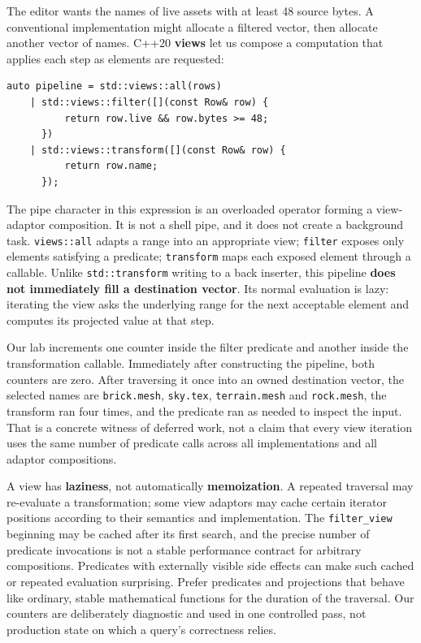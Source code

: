 The editor wants the names of live assets with at least 48 source bytes. A conventional implementation might allocate a filtered vector, then allocate another vector of names. C++20 \textbf{views} let us compose a computation that applies each step as elements are requested:

\begin{verbatim}
auto pipeline = std::views::all(rows)
    | std::views::filter([](const Row& row) {
          return row.live && row.bytes >= 48;
      })
    | std::views::transform([](const Row& row) {
          return row.name;
      });
\end{verbatim}

The pipe character in this expression is an overloaded operator forming a view-adaptor composition. It is not a shell pipe, and it does not create a background task. \texttt{views::all} adapts a range into an appropriate view; \texttt{filter} exposes only elements satisfying a predicate; \texttt{transform} maps each exposed element through a callable. Unlike \texttt{std::transform} writing to a back inserter, this pipeline \textbf{does not immediately fill a destination vector}. Its normal evaluation is lazy: iterating the view asks the underlying range for the next acceptable element and computes its projected value at that step.

Our lab increments one counter inside the filter predicate and another inside the transformation callable. Immediately after constructing the pipeline, both counters are zero. After traversing it once into an owned destination vector, the selected names are \texttt{brick.mesh}, \texttt{sky.tex}, \texttt{terrain.mesh} and \texttt{rock.mesh}, the transform ran four times, and the predicate ran as needed to inspect the input. That is a concrete witness of deferred work, not a claim that every view iteration uses the same number of predicate calls across all implementations and all adaptor compositions.

A view has \textbf{laziness}, not automatically \textbf{memoization}. A repeated traversal may re-evaluate a transformation; some view adaptors may cache certain iterator positions according to their semantics and implementation. The \texttt{filter\_view} beginning may be cached after its first search, and the precise number of predicate invocations is not a stable performance contract for arbitrary compositions. Predicates with externally visible side effects can make such cached or repeated evaluation surprising. Prefer predicates and projections that behave like ordinary, stable mathematical functions for the duration of the traversal. Our counters are deliberately diagnostic and used in one controlled pass, not production state on which a query's correctness relies.

